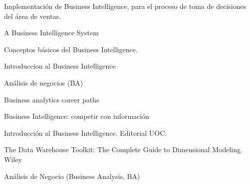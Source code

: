 \documentclass[twoside,twocolumn]{article}
\begin{document}
\begin{thebibliography}{99} 

\newblock Implementación de Business Intelligence, para el proceso de toma de decisiones del área de ventas.

\newblock A Business Intelligence System

Conceptos básicos del Business Intelligence.

\newblock Introduccion al Business Intelligence

\newblock Análisis de negocios (BA)

\newblock Business analytics career paths

\newblock Business Intelligence: competir con información


\bibitem[Curto J., 2010]{} 
\newblock Introducción al Business Intelligence. Editorial UOC.

\newblock  The Data Warehouse Toolkit: The Complete Guide to Dimensional Modeling. Wiley

\bibitem[Carolina A., 2017]{} 
\newblock  Análisis de Negocio (Business Analysis, BA)
 
\end{thebibliography}


\end{document}
